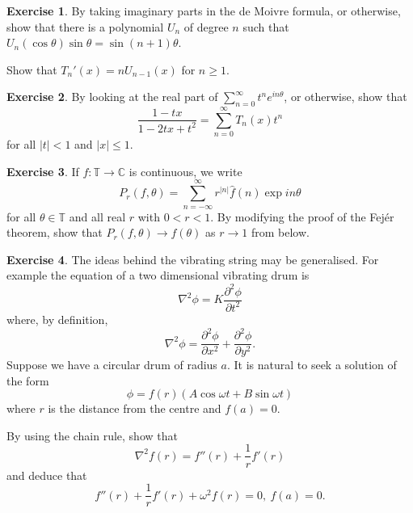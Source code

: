 \documentclass[12pt]{article}
\theoremstyle{definition}
\newtheorem{question}{Exercise}[section]
\begin{document}
\begin{question} By taking imaginary parts in the de Moivre formula,
or otherwise,
show that there is a polynomial
$U_{n}$ of degree $n$ such that 
$U_{n}(\cos\theta)\sin\theta=\sin(n+1)\theta$.

Show that $T_{n}'(x)=nU_{n-1}(x)$ for $n\geq 1$.
\end{question}
\begin{question} By looking at the real part of 
$\sum_{n=0}^{\infty}t^{n}e^{in\theta}$,
or otherwise, show that
\[\frac{1-tx}{1-2tx+t^{2}}=\sum_{n=0}^{\infty}T_{n}(x)t^{n}\]
for all $|t|<1$ and $|x|\leq 1$.
\end{question}

\begin{question} If $f:{\mathbb T}\rightarrow{\mathbb C}$
is continuous, we write
\[P_{r}(f,\theta)=\sum_{n=-\infty}^{\infty}r^{|n|}\hat{f}(n)\exp in\theta\]
for all $\theta\in{\mathbb T}$ and all real $r$ with $0<r<1$.
By modifying the proof of the Fej\'{e}r theorem,
show that $P_{r}(f,\theta)\rightarrow f(\theta)$ as
$r\rightarrow 1$ from below.
\end{question}

\begin{question} The ideas behind the vibrating string
may be generalised. For example the equation of a two
dimensional vibrating drum is
\[\nabla^{2}\phi=K\frac{\partial^{2}\phi}{\partial t^{2}}\]
where, by definition,
\[\nabla^{2}\phi=\frac{\partial^{2}\phi}{\partial x^{2}}
+\frac{\partial^{2}\phi}{\partial y^{2}}.\]
Suppose we have a circular drum of radius $a$.
It is natural to seek a solution of the form
\[\phi=f(r)(A\cos\omega t+B\sin\omega t)\]
where $r$ is the distance from the centre and $f(a)=0$.

By using the chain rule, show that
\[\nabla^{2}f(r)=f''(r)+\frac{1}{r}f'(r)\]
and deduce that
\[f''(r)+\frac{1}{r}f'(r)+\omega^{2}f(r)=0,\ f(a)=0.\]
\end{question}
\end{document}
